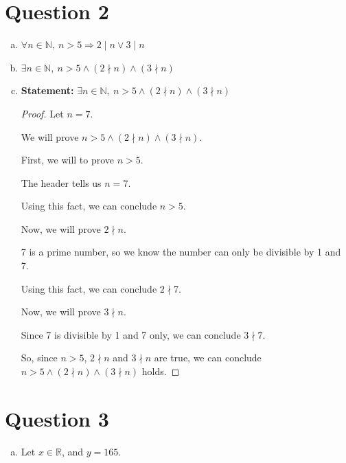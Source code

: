 \documentclass[12pt]{article}
\begin{document}
\section*{Question 2}
\begin{enumerate}[a.]
    \item $\forall n \in \mathbb{N},\:n > 5 \Rightarrow 2 \mid n \lor 3 \mid n$
    \item $\exists n \in \mathbb{N},\: n > 5 \land (2 \nmid n) \land (3 \nmid n)$
    \item

    \textbf{Statement:} $\exists n \in \mathbb{N},\: n > 5 \land (2 \nmid n) \land (3 \nmid n)$

    \begin{proof}
        Let $n = 7$.

        \bigskip

        We will prove $n>5 \land (2 \nmid n) \land (3 \nmid n)$.

        \bigskip

        First, we will to prove $n > 5$.

        \bigskip

        The header tells us $n = 7$.

        \bigskip

        Using this fact, we can conclude $n > 5$.

        \bigskip

        Now, we will prove $2 \nmid n$.

        \bigskip

        7 is a prime number, so we know the number can only be divisible by 1 and 7.

        \bigskip

        Using this fact, we can conclude $2 \nmid 7$.

        \bigskip

        Now, we will prove $3 \nmid n$.

        \bigskip

        Since 7 is divisible by 1 and 7 only, we can conclude $3 \nmid 7$.

        \bigskip

        So, since $n > 5$, $2 \nmid n$ and $3 \nmid n$ are true, we
        can conclude $n>5 \land (2 \nmid n) \land (3 \nmid n)$ holds.
    \end{proof}
\end{enumerate}

\section*{Question 3}
\begin{enumerate}[a.]
    \item Let $x \in \mathbb{R}$, and $y = 165$.
\end{enumerate}
\end{document}
